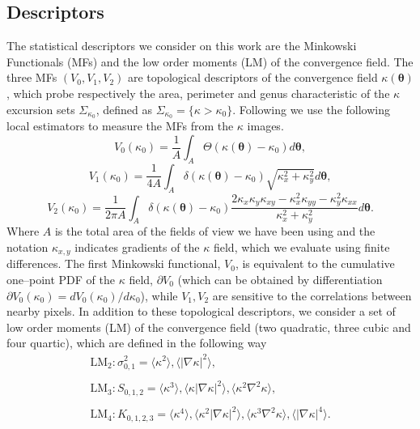 \documentclass[reprint,aps,prd,superscriptaddress,showkeys,showpacs]{revtex4-1}
\begin{document}
\subsection{Descriptors}
The statistical descriptors we consider on this work are the Minkowski Functionals (MFs) and the low order moments (LM) of the convergence field. The three MFs $(V_0,V_1,V_2)$ are topological descriptors of the convergence field $\kappa(\pmb{\theta})$, which probe respectively the area, perimeter and genus characteristic of the $\kappa$ excursion sets $\Sigma_{\kappa_0}$, defined as $\Sigma_{\kappa_0}=\{\kappa>\kappa_0\}$. Following \citep{Petri2013,MinkJan} we use the following local estimators to measure the MFs from the $\kappa$ images. 
%
\begin{equation*}
\label{v0meas}
V_0(\kappa_0)=\frac{1}{A}\int_A\Theta(\kappa(\pmb{\theta})-\kappa_0)d\pmb{\theta},
\end{equation*}
\begin{equation}
\label{v1meas}
V_1(\kappa_0)=\frac{1}{4A}\int_A\delta(\kappa(\pmb{\theta})-\kappa_0)\sqrt{\kappa_x^2+\kappa_y^2}d\pmb{\theta},
\end{equation}
\begin{equation*}
\label{v2meas}
V_2(\kappa_0)=\frac{1}{2\pi A}\int_A\delta(\kappa(\pmb{\theta})-\kappa_0)\frac{2\kappa_x\kappa_y\kappa_{xy}-\kappa_x^2\kappa_{yy}-\kappa_y^2\kappa_{xx}}{\kappa_x^2+\kappa_y^2}d\pmb{\theta}.
\end{equation*}
%
Where $A$ is the total area of the fields of view we have been using and the notation $\kappa_{x,y}$ indicates gradients of the $\kappa$ field, which we evaluate using finite differences. The first Minkowski functional, $V_0$, is equivalent to the cumulative one--point PDF of the $\kappa$ field, $\partial V_0$ (which can be obtained by differentiation $\partial V_0(\kappa_0)=dV_0(\kappa_0)/d\kappa_0$), while $V_1,V_2$ are sensitive to the correlations between nearby pixels. In addition to these topological descriptors, we consider a set of low order moments (LM) of the convergence field (two quadratic, three cubic and four quartic), which are defined in the following way
%
\begin{equation}
\label{momentestimator}
\begin{matrix}
\mathrm{LM_2}: \sigma_{0,1}^2 = \langle\kappa^2\rangle,\langle\vert\nabla\kappa\vert^2\rangle, \\ \\
\mathrm{LM_3}: S_{0,1,2} = \langle\kappa^3\rangle,\langle\kappa\vert\nabla\kappa\vert^2\rangle,\langle\kappa^2\nabla^2\kappa\rangle, \\ \\
\mathrm{LM_4}: K_{0,1,2,3} = \langle\kappa^4\rangle,\langle\kappa^2\vert\nabla\kappa\vert^2\rangle,\langle\kappa^3\nabla^2\kappa\rangle,\langle\vert\nabla\kappa\vert^4\rangle.
\end{matrix}
\end{equation}
\end{document}
